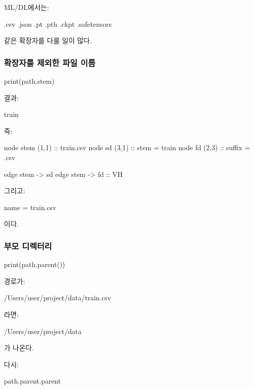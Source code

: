 ML/DL에서는:

\begin{dhkzsh}
.csv
.json
.pt
.pth
.ckpt
.safetensors
\end{dhkzsh}

같은 확장자를 다룰 일이 많다.

\subsubsection{확장자를 제외한 파일 이름}

\begin{dhkcode}
print(path.stem)
\end{dhkcode}

결과:

\begin{dhkzsh}
train
\end{dhkzsh}

즉:


\begin{dhkdiagram}[in=10]
node stem (1,1) :: train.csv
node sd (3,1)  :: stem = train
node fd (2,3)  :: suffix = .csv

edge stem -> sd
edge stem -> fd :: VH
\end{dhkdiagram}

그리고:

\begin{dhkzsh}
name = train.csv
\end{dhkzsh}

이다.

\subsubsection{부모 디렉터리}

\begin{dhkcode}
print(path.parent())
\end{dhkcode}

경로가:

\begin{dhkzsh}
/Users/user/project/data/train.csv
\end{dhkzsh}

라면:

\begin{dhkzsh}
/Users/user/project/data
\end{dhkzsh}

가 나온다.

다시:

\begin{dhkcode}
path.parent.parent
\end{dhkcode}

